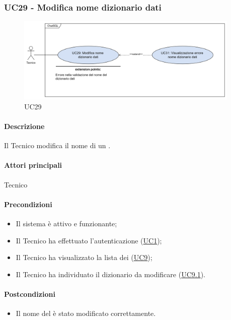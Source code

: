 \subsubsection{UC29 - Modifica nome dizionario dati}\label{UC29}

\begin{figure}[H]
  \centering
  \includegraphics[width=0.95\textwidth]{assets/uc29.png}
  \caption{UC29}
\end{figure}

\paragraph*{Descrizione}
Il Tecnico modifica il nome di un .

\paragraph*{Attori principali}
Tecnico

\paragraph*{Precondizioni}
\begin{itemize}
  \item Il sistema è attivo e funzionante;
  \item Il Tecnico ha effettuato l'autenticazione (\hyperref[UC1]{UC1});
  \item Il Tecnico ha visualizzato la lista dei  (\hyperref[UC9]{UC9});
  \item Il Tecnico ha individuato il dizionario da modificare (\hyperref[UC9.1]{UC9.1}).
\end{itemize}

\paragraph*{Postcondizioni}
\begin{itemize}
  \item Il nome del  è stato modificato correttamente.
\end{itemize}

